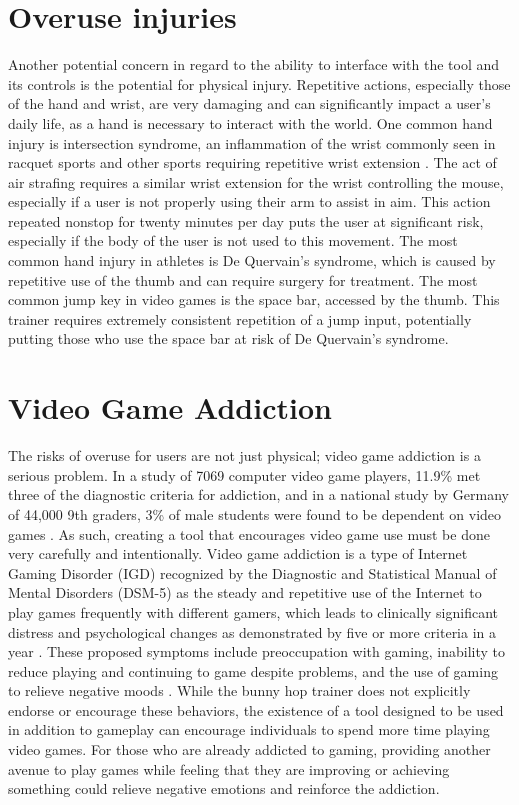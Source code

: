 \documentclass[10pt,twocolumn]{article}
\begin{document}
\section{Overuse injuries}
Another potential concern in regard to the ability to interface with the tool and its controls is the potential for physical injury. Repetitive actions, especially those of the hand and wrist, are very damaging and can significantly impact a user's daily life, as a hand is necessary to interact with the world. One common hand injury is intersection syndrome, an inflammation of the wrist commonly seen in racquet sports and other sports requiring repetitive wrist extension \cite{AthleticInjuriesOfWristAndHand}. The act of air strafing requires a similar wrist extension for the wrist controlling the mouse, especially if a user is not properly using their arm to assist in aim. This action repeated nonstop for twenty minutes per day puts the user at significant risk, especially if the body of the user is not used to this movement. The most common hand injury in athletes is De Quervain's syndrome, which is caused by repetitive use of the thumb and can require surgery for treatment\cite{AthleticInjuriesOfWristAndHand}. The most common jump key in video games is the space bar, accessed by the thumb. This trainer requires extremely consistent repetition of a jump input, potentially putting those who use the space bar at risk of De Quervain's syndrome.


\section{Video Game Addiction}
The risks of overuse for users are not just physical; video game addiction is a serious problem. In a study of 7069 computer video game players, 11.9\% met three of the diagnostic criteria for addiction, and in a national study by Germany of 44,000 9th graders, 3\% of male students were found to be dependent on video games \cite{ComputerandVideoGameAddiction}. As such, creating a tool that encourages video game use must be done very carefully and intentionally. Video game addiction is a type of Internet Gaming Disorder (IGD) recognized by the Diagnostic and
Statistical Manual of Mental Disorders (DSM-5) as the steady and repetitive use of the Internet to play games frequently with different gamers, which leads to clinically significant distress and psychological changes as demonstrated by five or more criteria in a year \cite{SymptomsMechanismsAndTreatments}. These proposed symptoms include preoccupation with gaming, inability to reduce playing and continuing to game despite problems, and the use of gaming to relieve negative moods \cite{InternetGaming}. While the bunny hop trainer does not explicitly endorse or encourage these behaviors, the existence of a tool designed to be used in addition to gameplay can encourage individuals to spend more time playing video games. For those who are already addicted to gaming, providing another avenue to play games while feeling that they are improving or achieving something could relieve negative emotions and reinforce the addiction.
\end{document}
